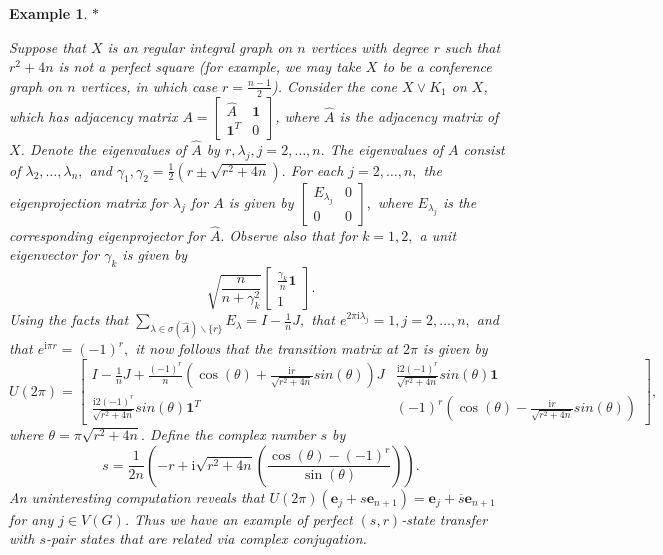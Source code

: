 \documentclass{article}
\numberwithin{equation}{section}
\newtheorem{ex}[lemma]{Example}
\newcommand{\uno}{\mathbf 1}
\newcommand{\be}{\mathbf e}
\def\ii{\mathrm{i}}
\begin{document}
{\begin{ex}\label{ex:reg}$*$\rm{
Suppose that $X$ is an regular integral graph on $n$ vertices with degree $r$ such that $r^2+4n$ is not a perfect square (for example, we may take $X$ to be a conference graph on $n$ vertices, in which case $r=\frac{n-1}{2}$). Consider the cone $X \vee K_1$ on $X$, which has adjacency matrix $A=\begin{bmatrix}
 \hat A &  \uno \\ \uno^T &0 
\end{bmatrix}$, where $\hat A$ is the adjacency matrix of $X$.  Denote the eigenvalues of $\hat A$ by $r, \lambda_j, j=2, \ldots, n.$ The eigenvalues of $A$ consist of $\lambda_2, \ldots, \lambda_n,$ and $\gamma_1, \gamma_2 = \frac{1}{2}(r \pm \sqrt{r^2+4n}).$ For each $j=2, \ldots, n,$ the eigenprojection matrix for $\lambda_j$ for $A$ is given by $\begin{bmatrix} E_{\lambda_j}&0\\0&0\end{bmatrix},$ where $E_{\lambda_j}$ is the corresponding eigenprojector for $\hat A.$ Observe also that for $k=1,2,$ a unit eigenvector for $\gamma_k$ is given by $$
\sqrt{\frac{n}{n+\gamma_k^2}}\begin{bmatrix} \frac{\gamma_k}{n}\uno \\ 1\end{bmatrix}. 
$$
Using the facts that $\sum_{\lambda \in \sigma(\hat A)\backslash \{r\} } E_{\lambda} =I-\frac{1}{n}J,$  that $e^{2\pi \ii \lambda_j}=1, j=2, \ldots, n,$ and that $ e^{\ii \pi r}=(-1)^r,$ 
it now follows that the transition matrix at $2\pi$ is given by $$U(2 \pi) = 
\begin{bmatrix} 
    I-\frac{1}{n}J + \frac{(-1)^r}{n} \left( \cos(\theta) + \frac{\ii r}{\sqrt{r^2+4n}}sin(\theta)\right) J & \frac{\ii 2(-1)^r}{\sqrt{r^2+4n}}sin(\theta)\uno \\  \frac{\ii 2(-1)^r}{\sqrt{r^2+4n}}sin(\theta)\uno^T & 
    (-1)^r\left( \cos(\theta) - \frac{\ii r}{\sqrt{r^2+4n}}sin(\theta) \right)
\end{bmatrix}, 
$$
where $\theta = \pi \sqrt{r^2+4n}.$ Define the complex number $s$ by $$
s = \frac{1}{2n}\left( -r + \ii \sqrt{r^2+4n} \left(\frac{\cos(\theta) - (-1)^r}{\sin(\theta)}\right) \right). 
$$ An uninteresting computation reveals that  $U(2\pi)(\be_j + s\be_{n+1}) = \be_j + \overline{ s}\be_{n+1}$ for any $j\in V(G)$. Thus we have an example of perfect $(s,r)$-state transfer with $s$-pair states   that are related via complex conjugation. 

}
\end{ex}}
\end{document}
